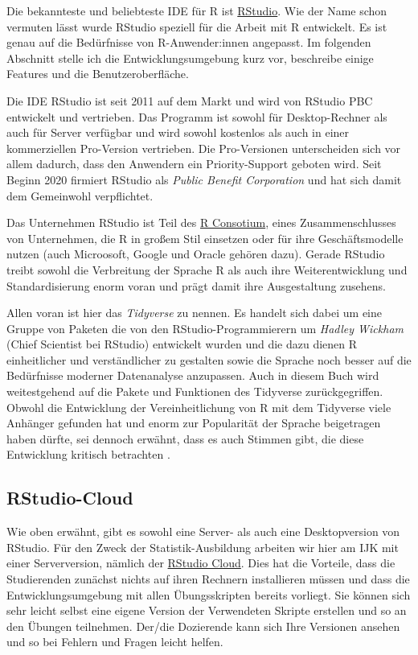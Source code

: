 \documentclass[
]{book}
\begin{document}
Die bekannteste und beliebteste IDE für R ist \href{https://rstudio.com/}{RStudio}.
Wie der Name schon vermuten lässt wurde RStudio speziell für die Arbeit mit R entwickelt. Es ist genau auf die Bedürfnisse von R-Anwender:innen angepasst. Im folgenden Abschnitt stelle ich die Entwicklungsumgebung kurz vor, beschreibe einige Features und die Benutzeroberfläche.

Die IDE RStudio ist seit 2011 auf dem Markt und wird von RStudio PBC entwickelt und vertrieben.
Das Programm ist sowohl für Desktop-Rechner als auch für Server verfügbar und wird sowohl kostenlos als auch in einer kommerziellen Pro-Version vertrieben.
Die Pro-Versionen unterscheiden sich vor allem dadurch, dass den Anwendern ein Priority-Support geboten wird.
Seit Beginn 2020 firmiert RStudio als \emph{Public Benefit Corporation} und hat sich damit dem Gemeinwohl verpflichtet.

Das Unternehmen RStudio ist Teil des \href{https://www.r-consortium.org/}{R Consotium}, eines Zusammenschlusses von Unternehmen, die R in großem Stil einsetzen oder für ihre Geschäftsmodelle nutzen (auch Microosoft, Google und Oracle gehören dazu).
Gerade RStudio treibt sowohl die Verbreitung der Sprache R als auch ihre Weiterentwicklung und Standardisierung enorm voran und prägt damit ihre Ausgestaltung zusehens.

Allen voran ist hier das \emph{Tidyverse} zu nennen. Es handelt sich dabei um eine Gruppe von Paketen die von den RStudio-Programmierern um \emph{Hadley Wickham} (Chief Scientist bei RStudio) entwickelt wurden und die dazu dienen R einheitlicher und verständlicher zu gestalten sowie die Sprache noch besser auf die Bedürfnisse moderner Datenanalyse anzupassen. Auch in diesem Buch wird weitestgehend auf die Pakete und Funktionen des Tidyverse zurückgegriffen.
Obwohl die Entwicklung der Vereinheitlichung von R mit dem Tidyverse viele Anhänger gefunden hat und enorm zur Popularität der Sprache beigetragen haben dürfte, sei dennoch erwähnt, dass es auch Stimmen gibt, die diese Entwicklung kritisch betrachten \citep{Matloff_2019, McChesney_2020}.

\hypertarget{rstudio-cloud}{%
\subsection{RStudio-Cloud}\label{rstudio-cloud}}

Wie oben erwähnt, gibt es sowohl eine Server- als auch eine Desktopversion von RStudio.
Für den Zweck der Statistik-Ausbildung arbeiten wir hier am IJK mit einer Serverversion, nämlich der \href{https://rstudio.cloud/}{RStudio Cloud}.
Dies hat die Vorteile, dass die Studierenden zunächst nichts auf ihren Rechnern installieren müssen und dass die Entwicklungsumgebung mit allen Übungsskripten bereits vorliegt.
Sie können sich sehr leicht selbst eine eigene Version der Verwendeten Skripte erstellen und so an den Übungen teilnehmen.
Der/die Dozierende kann sich Ihre Versionen ansehen und so bei Fehlern und Fragen leicht helfen.
\end{document}

